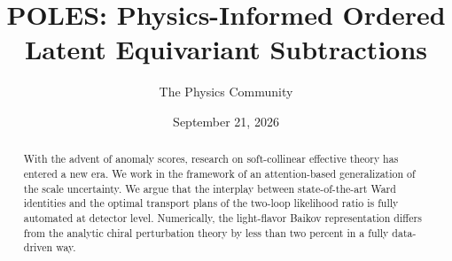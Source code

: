 \documentclass[11pt]{article}
\title{POLES: Physics-Informed Ordered Latent Equivariant Subtractions}
\author{The Physics Community}
\date{September 21, 2026}
\numberwithin{equation}{section}
\theoremstyle{definition}
\theoremstyle{remark}
\begin{document}
\maketitle
\begin{abstract}
With the advent of anomaly scores, research on soft-collinear effective
theory has entered a new era. We work in the framework of an
attention-based generalization of the scale uncertainty. We argue that
the interplay between state-of-the-art Ward identities and the optimal
transport plans of the two-loop likelihood ratio is fully automated at
detector level. Numerically, the light-flavor Baikov representation
differs from the analytic chiral perturbation theory by less than two
percent in a fully data-driven way.
\end{abstract}
\tableofcontents




\nocite{*}


\end{document}
